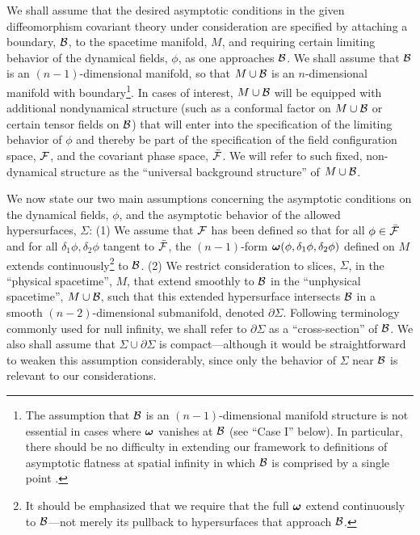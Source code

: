 We shall assume that the desired asymptotic conditions in the given
diffeomorphism covariant theory under consideration are specified by
attaching a boundary, ${\cal B}$, to the spacetime manifold, $M$, and
requiring certain limiting behavior of the dynamical fields, $\phi$,
as one approaches ${\cal B}$. We shall assume that ${\cal B}$ is an
$(n-1)$-dimensional manifold, so that $M \cup {\cal B}$ is an
$n$-dimensional manifold with boundary\footnote{The assumption that
${\cal B}$ is an $(n-1)$-dimensional manifold structure is not
essential in cases where ${\mbox{\boldmath $\omega$}}$ vanishes at
${\cal B}$ (see ``Case I'' below). In particular, there should be no
difficulty in extending our framework to definitions of asymptotic
flatness at spatial infinity in which ${\cal B}$ is comprised by a
single point \cite{ah}.}. In cases of interest, $M \cup {\cal B}$ will
be equipped with additional nondynamical structure (such as a
conformal factor on $M \cup {\cal B}$ or certain tensor fields on
$\cal B$) that will enter into the specification of the limiting
behavior of $\phi$ and thereby be part of the specification of the
field configuration space, ${\cal F}$, and the covariant phase space,
$\bar{\cal F}$. We will refer to such fixed, non-dynamical structure
as the ``universal background structure'' of $M \cup {\cal B}$.

We now state our two main assumptions concerning the asymptotic
conditions on the dynamical fields, $\phi$, and the asymptotic
behavior of the allowed hypersurfaces, $\Sigma$: (1) We assume that
${\cal F}$ has been defined so that for all $\phi \in \bar{\cal F}$
and for all $\delta_1 \phi, \delta_2 \phi$ tangent to $\bar{\cal F}$,
the $(n-1)$-form ${\mbox{\boldmath $\omega$}} (\phi, \delta_1 \phi,
\delta_2 \phi)$ defined on $M$ extends continuously\footnote{It should
be emphasized that we require that the full ${\mbox{\boldmath
$\omega$}}$ extend continuously to $\cal B$---not merely its pullback 
to hypersurfaces that approach $\cal B$.} to ${\cal B}$. (2)
We restrict consideration to slices, $\Sigma$, in the
``physical spacetime'', $M$, that extend smoothly to ${\cal B}$ in
the ``unphysical spacetime'', $M \cup {\cal B}$, such that this
extended hypersurface intersects ${\cal B}$ in a smooth
$(n-2)$-dimensional submanifold, denoted $\partial \Sigma$. Following
terminology commonly used for null infinity, we shall refer to
$\partial \Sigma$ as a ``cross-section'' of ${\cal B}$.
We also shall assume that $\Sigma \cup \partial \Sigma$ is
compact---although it would be straightforward to weaken this
assumption considerably, since only the behavior of $\Sigma$ near
${\cal B}$ is relevant to our considerations.

